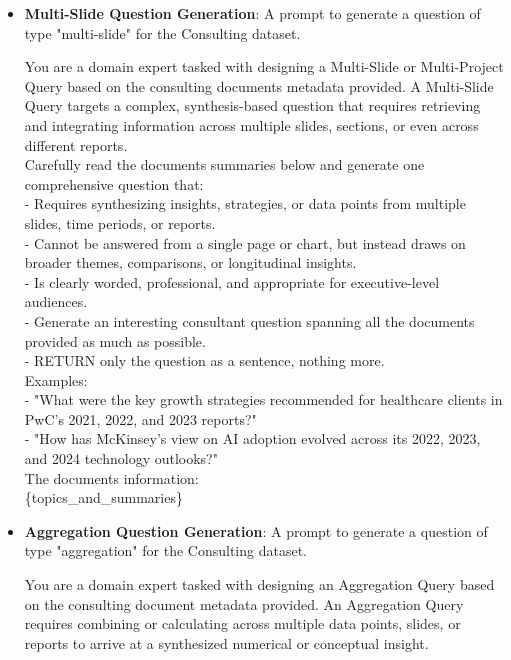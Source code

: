 \documentclass[12pt,twoside]{report}
\begin{document}
\begin{itemize}
\begin{colquote}
    The document information: \\
    topic: \{topic\} \\
    summary: \{summary\}
    \end{colquote}

    \item \textbf{Multi-Slide Question Generation}: A prompt to generate a question of type "multi-slide" for the Consulting dataset.
    \begin{colquote}
    You are a domain expert tasked with designing a Multi-Slide or Multi-Project Query based on the consulting documents metadata provided. A Multi-Slide Query targets a complex, synthesis-based question that requires retrieving and integrating information across multiple slides, sections, or even across different reports. \\

    Carefully read the documents summaries below and generate one comprehensive question that: \\
    - Requires synthesizing insights, strategies, or data points from multiple slides, time periods, or reports. \\
    - Cannot be answered from a single page or chart, but instead draws on broader themes, comparisons, or longitudinal insights. \\
    - Is clearly worded, professional, and appropriate for executive-level audiences. \\
    - Generate an interesting consultant question spanning all the documents provided as much as possible. \\
    - RETURN only the question as a sentence, nothing more. \\

    Examples: \\
    - "What were the key growth strategies recommended for healthcare clients in PwC's 2021, 2022, and 2023 reports?" \\
    - "How has McKinsey's view on AI adoption evolved across its 2022, 2023, and 2024 technology outlooks?" \\

    The documents information: \\
    \{topics_and_summaries\}
    \end{colquote}

    \item \textbf{Aggregation Question Generation}: A prompt to generate a question of type "aggregation" for the Consulting dataset.
    \begin{colquote}
    You are a domain expert tasked with designing an Aggregation Query based on the consulting document metadata provided. An Aggregation Query requires combining or calculating across multiple data points, slides, or reports to arrive at a synthesized numerical or conceptual insight. \\


\end{colquote}
\end{itemize}
\end{document}
